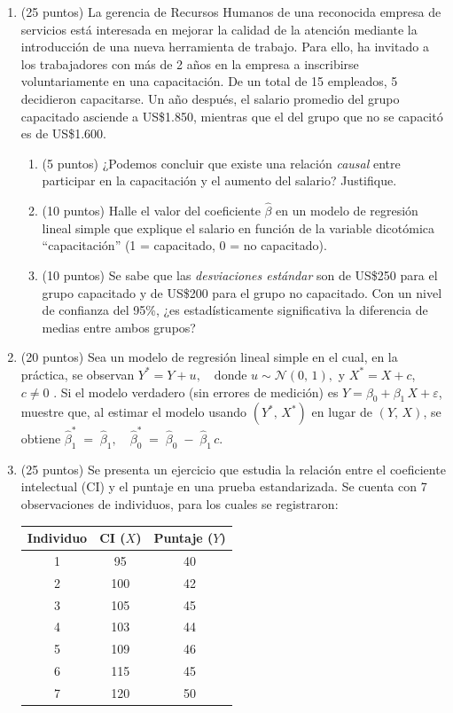 \documentclass[10pt,a4paper]{article}
\begin{document}
\begin{enumerate}
    \item (25 puntos) La gerencia de Recursos Humanos de una reconocida empresa de servicios está interesada en mejorar la calidad de la atención mediante la introducción de una nueva herramienta de trabajo. Para ello, ha invitado a los trabajadores con más de 2 años en la empresa a inscribirse voluntariamente en una capacitación. De un total de 15 empleados, 5 decidieron capacitarse. Un año después, el salario promedio del grupo capacitado asciende a US\$1.850, mientras que el del grupo que no se capacitó es de US\$1.600.

\begin{enumerate}
    \item  (5 puntos) ¿Podemos concluir que existe una relación \textit{causal} entre participar en la capacitación y el aumento del salario? Justifique.

    \item  (10 puntos) Halle el valor del coeficiente $\hat{\beta}$ en un modelo de regresión lineal simple que explique el salario en función de la variable dicotómica ``capacitación'' (1 = capacitado, 0 = no capacitado).

    \item (10 puntos) Se sabe que las \textit{desviaciones estándar} son de US\$250 para el grupo capacitado y de US\$200 para el grupo no capacitado. Con un nivel de confianza del 95\%, ¿es estadísticamente significativa la diferencia de medias entre ambos grupos?
\end{enumerate}

\item (20 puntos) Sea un modelo de regresión lineal simple en el cual, en la práctica, se observan $
Y^* = Y + u, \quad \text{donde } u \sim \mathcal{N}(0,\,1),
$ y $
X^* = X + c$, \quad {} $c \neq 0$ . Si el modelo verdadero (sin errores de medición) es $
Y = \beta_0 + \beta_1 \, X + \varepsilon$, muestre que, al estimar el modelo usando \((Y^*,\,X^*)\) en lugar de \((Y,\,X)\), se obtiene $\hat{\beta}_1^* \;=\; \hat{\beta}_1,
\quad
\hat{\beta}_0^* \;=\; \hat{\beta}_0 \;-\;\hat{\beta}_1 \, c.
$

\item (25 puntos) Se presenta un ejercicio que estudia la relación entre el coeficiente intelectual (CI) y el puntaje en una prueba estandarizada. Se cuenta con 7 observaciones de individuos, para los cuales se registraron:

\begin{center}
\begin{tabular}{|c|c|c|}
\hline
\textbf{Individuo} & \textbf{CI} ($X$) & \textbf{Puntaje} ($Y$)\\
\hline
1 & 95  & 40 \\
2 & 100 & 42 \\
3 & 105 & 45 \\
4 & 103 & 44 \\
5 & 109 & 46 \\
6 & 115 & 45 \\
7 & 120 & 50 \\
\hline
\end{tabular}
\end{center}


\end{enumerate}
\end{document}
